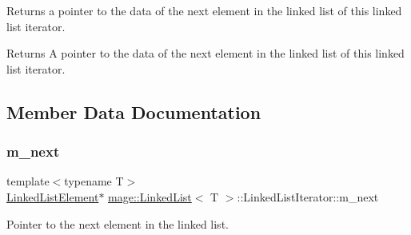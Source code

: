 Returns a pointer to the data of the next element in the linked list of this linked list iterator.

\begin{DoxyReturn}{Returns}
A pointer to the data of the next element in the linked list of this linked list iterator. 
\end{DoxyReturn}


\subsection{Member Data Documentation}
\hypertarget{structmage_1_1_linked_list_1_1_linked_list_iterator_a2936c8e80e5ef746150a8a93ef1300cb}{}\label{structmage_1_1_linked_list_1_1_linked_list_iterator_a2936c8e80e5ef746150a8a93ef1300cb} 
\subsubsection{\texorpdfstring{m\+\_\+next}{m\_next}}
{\footnotesize\ttfamily template$<$typename T$>$ \\
\hyperlink{structmage_1_1_linked_list_1_1_linked_list_element}{Linked\+List\+Element}$\ast$ \hyperlink{classmage_1_1_linked_list}{mage\+::\+Linked\+List}$<$ T $>$\+::Linked\+List\+Iterator\+::m\+\_\+next\hspace{0.3cm}{\ttfamily [private]}}

Pointer to the next element in the linked list. 
